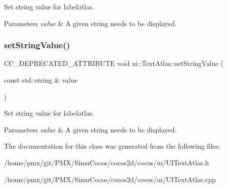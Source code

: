 Set string value for labelatlas.


\begin{DoxyParams}{Parameters}
{\em value} & A given string needs to be displayed. \\
\hline
\end{DoxyParams}
\mbox{\label{classui_1_1TextAtlas_af0f33051246221a59b0127462f5b9ab4}} 
\subsubsection{\texorpdfstring{set\+String\+Value()}{setStringValue()}\hspace{0.1cm}{\footnotesize\ttfamily [2/2]}}
{\footnotesize\ttfamily C\+C\+\_\+\+D\+E\+P\+R\+E\+C\+A\+T\+E\+D\+\_\+\+A\+T\+T\+R\+I\+B\+U\+TE void ui\+::\+Text\+Atlas\+::set\+String\+Value (\begin{DoxyParamCaption}\item[{const std\+::string \&}]{value }\end{DoxyParamCaption})\hspace{0.3cm}{\ttfamily [inline]}}

Set string value for labelatlas.


\begin{DoxyParams}{Parameters}
{\em value} & A given string needs to be displayed. \\
\hline
\end{DoxyParams}


The documentation for this class was generated from the following files\+:\begin{DoxyCompactItemize}
\item 
/home/pmx/git/\+P\+M\+X/\+Simu\+Cocos/cocos2d/cocos/ui/U\+I\+Text\+Atlas.\+h\item 
/home/pmx/git/\+P\+M\+X/\+Simu\+Cocos/cocos2d/cocos/ui/U\+I\+Text\+Atlas.\+cpp\end{DoxyCompactItemize}
